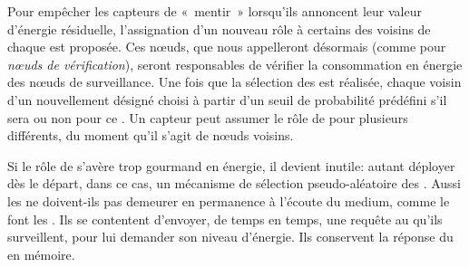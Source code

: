 Pour empêcher les capteurs de « mentir » lorsqu'ils annoncent leur valeur d'énergie résiduelle, l'assignation d'un nouveau rôle à certains des voisins de chaque \cn est proposée.
Ces nœuds, que nous appelleront désormais \vns (comme pour \textit{nœuds de vérification}), seront responsables de vérifier la consommation en énergie des nœuds de surveillance.
Une fois que la sélection des \cns est réalisée, chaque voisin d'un \cn nouvellement désigné choisi à partir d'un seuil de probabilité prédéfini s'il sera ou non \vn pour ce \cn.
Un capteur peut assumer le rôle de \vn pour plusieurs \cn différents, du moment qu'il s'agit de nœuds voisins.

Si le rôle de \vn s'avère trop gourmand en énergie, il devient inutile: autant déployer dès le départ, dans ce cas, un mécanisme de sélection pseudo-aléatoire des \cns.
Aussi les \vns ne doivent-ils pas demeurer en permanence à l'écoute du medium, comme le font les \cns.
Ils se contentent d'envoyer, de temps en temps, une requête au \cn qu'ils surveillent, pour lui demander son niveau d'énergie.
Ils conservent la réponse du \cn en mémoire.


